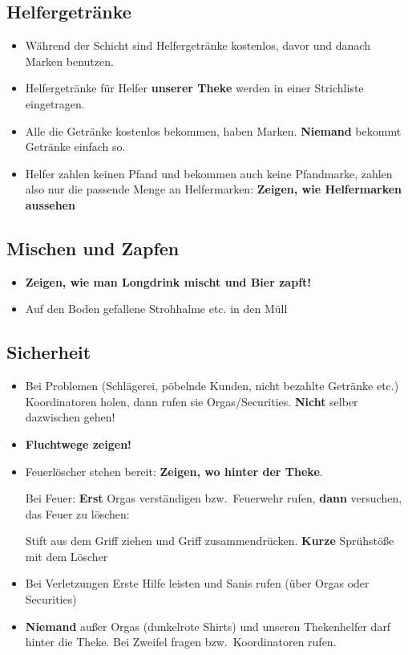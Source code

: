 \subsection{Helfergetränke}
\begin{itemize}
  \renewcommand{\labelitemi}{$\Box$}
  \item Während der Schicht sind Helfergetränke kostenlos, davor und danach Marken benutzen.
  \item Helfergetränke für Helfer \textbf{unserer Theke} werden in einer Strichliste eingetragen.
  \item Alle die Getränke kostenlos bekommen, haben Marken. \textbf{Niemand} bekommt Getränke einfach so.
  \item Helfer zahlen keinen Pfand und bekommen auch keine Pfandmarke, zahlen also nur die passende Menge an Helfermarken: \textbf{Zeigen, wie Helfermarken aussehen}
\end{itemize}
\subsection{Mischen und Zapfen}
\begin{itemize}
  \renewcommand{\labelitemi}{$\Box$}
  \item \textbf{Zeigen, wie man Longdrink mischt und Bier zapft!}
  \item Auf den Boden gefallene Strohhalme etc. in den Müll
\end{itemize}
\subsection{Sicherheit}
\begin{itemize}
  \renewcommand{\labelitemi}{$\Box$}
  \item Bei Problemen (Schlägerei, pöbelnde Kunden, nicht bezahlte Getränke etc.) Koordinatoren holen, dann rufen sie Orgas/Securities. \textbf{Nicht} selber dazwischen gehen!
  \item \textbf{Fluchtwege zeigen!}
  \item Feuerlöscher stehen bereit: \textbf{Zeigen, wo hinter der Theke}.
    
    Bei Feuer: \textbf{Erst} Orgas verständigen bzw.\ Feuerwehr rufen, \textbf{dann} versuchen, das Feuer zu löschen:
    
    Stift aus dem Griff ziehen und Griff zusammendrücken. \textbf{Kurze} Sprühstöße mit dem Löscher
  \item Bei Verletzungen Erste Hilfe leisten und Sanis rufen (über Orgas oder Securities)
  \item \textbf{Niemand} außer Orgas (dunkelrote Shirts) und unseren Thekenhelfer darf hinter die Theke. Bei Zweifel fragen bzw.\ Koordinatoren rufen.
\end{itemize}
